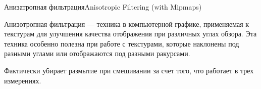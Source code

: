 \documentclass{beamer}
\begin{document}
	\begin{frame}{Анизатропная фильтрация}{Anisotropic Filtering (with Mipmaps)}


		
		Анизотропная фильтрация --- техника в компьютерной графике, применяемая к текстурам для улучшения качества отображения при различных углах обзора. Эта техника особенно полезна при работе с текстурами, которые наклонены под разными углами или отображаются под разными ракурсами.
		
		Фактически убирает размытие при смешивании за счет того, что работает в трех измерениях.
		
		
		
		
		
	


	\end{frame}
\end{document}
